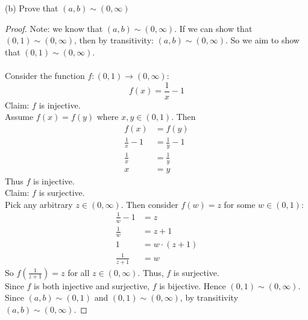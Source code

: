 \documentclass{amsart}
\begin{document}
\begin{enumerate}[1.]
(b) Prove that $(a,b) \sim (0,\infty)$
\begin{proof}
Note: we know that $(a,b) \sim (0,\infty)$. If we can show that
$(0,1) \sim (0,\infty)$, then by transitivity: $(a,b)\sim (0,\infty)$.
So we aim to show that $(0,1) \sim (0,\infty)$. \\\\
Consider the function $f: (0,1) \rightarrow (0, \infty)$:
\[
    f(x) = \frac{1}{x} - 1    
\]
Claim: $f$ is injective. \\
Assume $f(x) = f(y)$ where $x,y\in(0,1)$. Then
\begin{align*}
    f(x) &= f(y) \\
    \frac{1}{x} - 1 &= \frac{1}{y} - 1 \\
    \frac{1}{x} &= \frac{1}{y} \\
    x &= y
\end{align*}
Thus $f$ is injective. \\
Claim: $f$ is surjective. \\
Pick any arbitrary $z\in(0,\infty)$. Then consider
$f(w) = z$ for some $w\in(0,1)$:
\begin{align*}
    \frac{1}{w} - 1 &= z \\
    \frac{1}{w} &= z + 1 \\
    1 &= w\cdot (z + 1) \\
    \frac{1}{z+1} &= w
\end{align*}
So $f(\frac{1}{z+1}) = z$ for all $z\in(0,\infty)$. 
Thus, $f$ is surjective.\\
Since $f$ is both injective and surjective, $f$ is bijective. Hence
$(0,1) \sim (0,\infty)$. \\
Since $(a,b) \sim (0,1)$ and $(0,1) \sim (0,\infty)$, by transitivity
$(a,b) \sim (0,\infty)$.
\end{proof}
\newpage


\end{enumerate}
\end{document}
